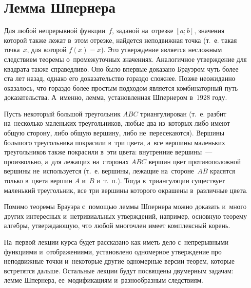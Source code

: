 
\section*{Лемма Шпернера}



Для любой непрерывной функции~$f$, заданой на~отрезке $[a; b]$, значения
которой также лежат в~этом отрезке, найдется неподвижная точка
(т.~е. такая точка~$x$, для которой $f(x) = x$).
Это утверждение является несложным следствием теоремы о~промежуточных
значениях.
Аналогичное утверждение для квадрата также справедливо.
Оно было впервые доказано Брауэром чуть более ста лет назад, однако его
доказательство гораздо сложнее.
Позже неожиданно оказалось, что гораздо более простым подходом является
комбинаторный путь доказательства.
А~именно, лемма, установленная Шпернером в~1928 году.

\begin{minipage}{0.25\textwidth}
\end{minipage}%
\hspace{0.05\textwidth}
\begin{minipage}{0.70\textwidth}
Пусть некоторый большой треугольник $ABC$ триангулирован (т.~е. разбит
на~несколько маленьких треугольников, любые два из~которых либо имеют общую
сторону, либо общую вершину, либо не~пересекаются).
Вершины большого треугольника покрасили в~три цвета, а~все вершины маленьких
треугольников также покрасили в~эти цвета: внутренние вершины~--- произвольно,
а~для лежащих на~сторонах $ABC$ вершин цвет противоположной вершины
не~используется (т.~е. вершины, лежащие на~стороне~$AB$ красятся только
в~цвета вершин $A$ и~$B$ и~т.~п.).
Тогда в~триангуляции существует маленький треугольник, все три вершины которого
окрашены в~различные цвета.
\end{minipage}

Помимо теоремы Брауэра с~помощью леммы Шпернера можно доказать и~много других
интересных и~нетривиальных утверждений, например, основную теорему алгебры,
утверждающую, что любой многочлен имеет комплексный корень.

На~первой лекции курса будет рассказано как иметь дело с~непрерывными функциями
и~отображениями, установлено одномерное утверждение про неподвижные точки
и~некоторые другие одномерные версии теорем, которые встретятся дальше.
Остальные лекции будут посвящены двумерным задачам: лемме Шпернера,
ее~модификациям и~разнообразным следствиям.


